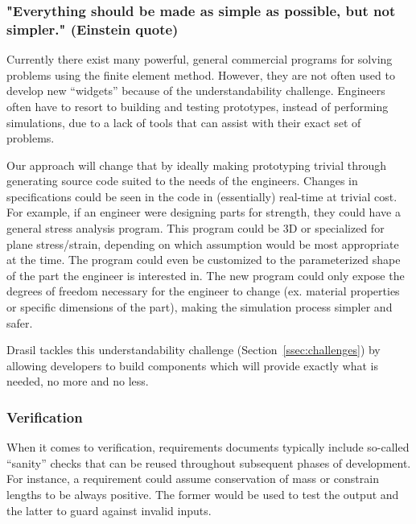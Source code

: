 \documentclass{sig-alternate-05-2015}
\newcommand{\lss}{Drasil}
\begin{document}
\subsubsection{"Everything should be made as simple as possible, but not
  simpler."  (Einstein quote)} \label{sssec:adv_simple}

Currently there exist many powerful, general commercial programs for solving
problems using the finite element method. However, they are not often used to
develop new ``widgets'' because of the understandability challenge.
Engineers often have to resort to building and testing prototypes, instead of
performing simulations, due to a lack of tools that can assist with their exact
set of problems. %

Our approach will change that by ideally making prototyping trivial through
generating source code suited to the needs of the engineers. Changes in
specifications could be seen in the code in (essentially) real-time at trivial
cost. For example, if an engineer were designing parts for strength, they could
have a general stress analysis program. This program could be 3D or specialized
for plane stress/strain, depending on which assumption would be most appropriate
at the time. The program could even be customized to the parameterized shape of
the part the engineer is interested in. The new program could only expose the
degrees of freedom necessary for the engineer to change (ex. material properties
or specific dimensions of the part), making the simulation process simpler and
safer.

\lss{} tackles this understandability challenge (Section~\ref{ssec:challenges})
by allowing developers to build components which will provide exactly what is
needed, no more and no less.

\subsubsection{Verification} \label{sssec:adv_verify}

When it comes to verification, requirements documents typically include
so-called ``sanity'' checks that can be reused throughout subsequent phases of
development. For instance, a requirement could assume conservation of mass or
constrain lengths to be always positive. The former would be used to test the
output and the latter to guard against invalid inputs.
\end{document}
